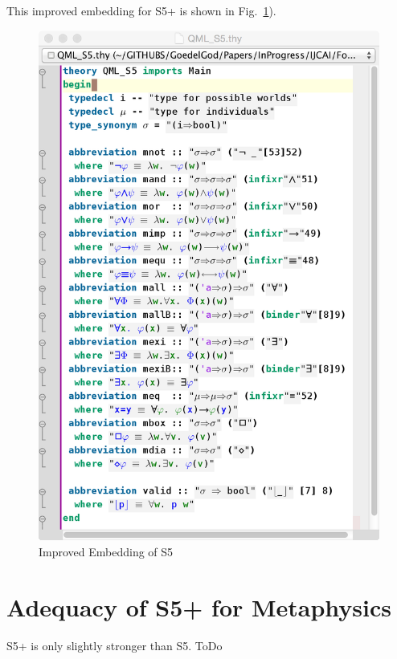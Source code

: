 \documentclass{article}
\begin{document}
This improved embedding for S5+ is shown in Fig.~\ref{QMLS5}).
\begin{figure}
\centerline{\includegraphics[width=\columnwidth]{./Images/QMLS5.png}}
\caption{Improved Embedding of S5} \label{QMLS5}
\end{figure}


\section{Adequacy of S5+ for Metaphysics}

S5+ is only slightly stronger than S5.  ToDo
\end{document}
